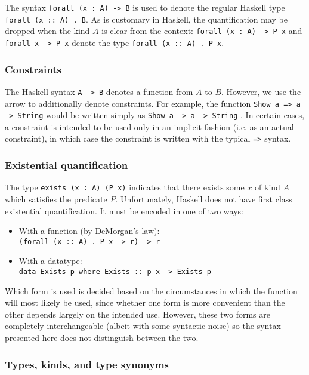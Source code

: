 The syntax \lstinline!forall (x : A) -> B! is used to denote the regular
Haskell type \texttt{forall (x :: A) . B}. As is customary in Haskell, the 
quantification
may be dropped when the kind $A$ is clear from the context: 
\lstinline!forall (x : A) -> P x! 
and
\lstinline!forall x -> P x! denote the type \texttt{forall (x :: A) . P x}.

\subsubsection*{Constraints}

The Haskell syntax \texttt{A -> B} denotes a function from $A$ to $B$. However,
we use the arrow to additionally denote constraints. For example, the function
\texttt{Show a => a -> String} would be written simply as 
\lstinline!Show a -> a -> String!
.
In certain cases, a constraint is intended to be used only in an implicit 
fashion 
(i.e. as an actual constraint), in which case the constraint is written with 
the typical \lstinline{=>} syntax. 

\subsubsection*{Existential quantification}

The type \lstinline!exists (x : A) (P x)! indicates that there exists some $x$
of kind $A$ which satisfies the predicate $P$. Unfortunately, Haskell does not
have first class existential quantification. It must be encoded in one of
two ways:


\begin{itemize}
    \item With a function (by DeMorgan's law): \\ \texttt{(forall (x :: A) . P 
    x -> r) -> r}
    \item With a datatype: \\ \texttt{data Exists p where Exists :: p x -> 
    Exists p}
\end{itemize} 

Which form is used is decided based on the circumstances in which the function
will most likely be used, since whether one form is more convenient than the
other depends largely on the intended use. However, these two forms are
completely interchangeable (albeit with some syntactic noise) so the syntax
presented here does not distinguish between the two. 

\subsubsection*{Types, kinds, and type synonyms}

